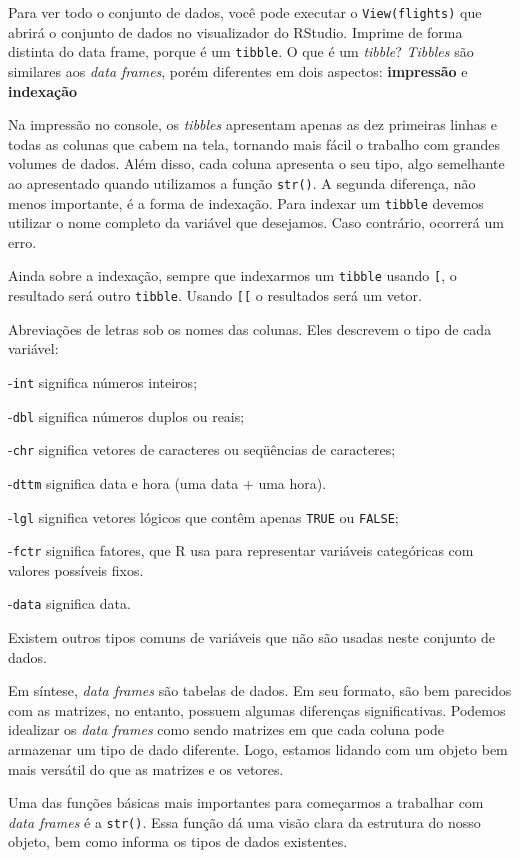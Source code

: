 \documentclass[]{book}
\begin{document}
Para ver todo o conjunto de dados, você pode executar o \texttt{View(flights)} que abrirá o conjunto de dados no visualizador do RStudio. Imprime de forma distinta do data frame, porque é um \texttt{tibble}. O que é um \emph{tibble}?
\emph{Tibbles} são similares aos \emph{data frames}, porém diferentes em dois aspectos: \textbf{impressão} e \textbf{indexação}

Na impressão no console, os \emph{tibbles} apresentam apenas as dez primeiras linhas e todas as colunas que cabem na tela, tornando mais fácil o trabalho com grandes volumes de dados. Além disso, cada coluna apresenta o seu tipo, algo semelhante ao apresentado quando utilizamos a função \texttt{str()}. A segunda diferença, não menos importante, é a forma de indexação. Para indexar um \texttt{tibble} devemos utilizar o nome completo da variável que desejamos. Caso contrário, ocorrerá um erro.

Ainda sobre a indexação, sempre que indexarmos um \texttt{tibble} usando \texttt{{[}}, o resultado será outro \texttt{tibble}. Usando \texttt{{[}{[}} o resultados será um vetor.

Abreviações de letras sob os nomes das colunas. Eles descrevem o tipo de cada variável:

-\texttt{int} significa números inteiros;

-\texttt{dbl} significa números duplos ou reais;

-\texttt{chr} significa vetores de caracteres ou seqüências de caracteres;

-\texttt{dttm} significa data e hora (uma data + uma hora).

-\texttt{lgl} significa vetores lógicos que contêm apenas \texttt{TRUE} ou \texttt{FALSE};

-\texttt{fctr} significa fatores, que R usa para representar variáveis categóricas com valores possíveis fixos.

-\texttt{data} significa data.

Existem outros tipos comuns de variáveis que não são usadas neste conjunto de dados.

Em síntese, \emph{data frames} são tabelas de dados. Em seu formato, são bem parecidos com as matrizes, no entanto, possuem algumas diferenças significativas. Podemos idealizar os \emph{data frames} como sendo matrizes em que cada coluna pode armazenar um tipo de dado diferente. Logo, estamos lidando com um objeto bem mais versátil do que as matrizes e os vetores.

Uma das funções básicas mais importantes para começarmos a trabalhar com \emph{data frames} é a \texttt{str()}. Essa função dá uma visão clara da estrutura do nosso objeto, bem como informa os tipos de dados existentes.
\end{document}
